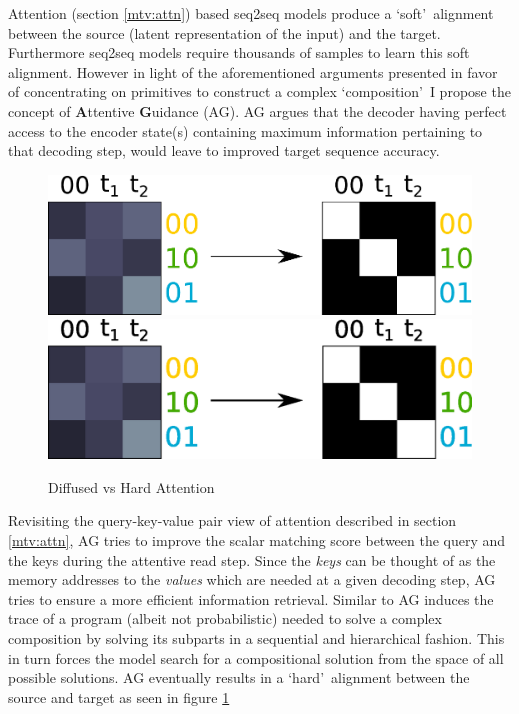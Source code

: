 Attention (section \ref{mtv:attn}) based seq2seq models produce a \lq soft{}\rq\ alignment between the source (latent representation of the input) and the target. Furthermore seq2seq models require thousands of samples to learn this soft alignment. However in light of the aforementioned arguments presented in favor of concentrating on primitives to construct a complex \lq composition{}\rq\ I propose the concept of \textbf{A}ttentive \textbf{G}uidance (AG). AG argues that the decoder having perfect access to the encoder state(s) containing maximum information pertaining to that decoding step, would leave to improved target sequence accuracy.

\begin{figure}
	\begin{minipage}[t]{\textwidth}
		\ifpdf
		\includegraphics[width=\linewidth,keepaspectratio=true]{./figs/attention-guidance-pdf}
		\else
		\includegraphics[width=\linewidth,keepaspectratio=true]{./figs/attention-guidance-eps}
		\fi
		\caption{\small Diffused vs Hard Attention}
		\label{pm:ag-schematic}
	\end{minipage}
\end{figure}

Revisiting the query-key-value pair view of attention described in section \ref{mtv:attn}, AG tries to improve the scalar matching score between the query and the keys during the attentive read step. Since the \textit{keys} can be thought of as the memory addresses to the \textit{values} which are needed at a given decoding step, AG tries to ensure a more efficient information retrieval. Similar to \cite{Lake2015} AG induces the trace of a program (albeit not probabilistic) needed to solve a complex composition by solving its subparts in a sequential and hierarchical fashion. This in turn forces the model search for a compositional solution from the space of all possible solutions. AG eventually results in a \lq hard{}\rq\ alignment between the source and target as seen in figure \ref{pm:ag-schematic}


